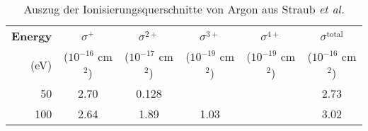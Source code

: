 \begin{table}[h]
    \centering
    \caption[Auszug der Ionisierungsquerschnitte von Argon aus Straub \textit{et al.} \cite{Straub}]{Auszug der Ionisierungsquerschnitte von Argon aus Straub \textit{et al.} \cite{Straub}}
    \begin{tabular}{r c c c c c}
        \toprule
        \textbf{Energy} & $\sigma^+$ & $\sigma^{2+}$ & $\sigma^{3+}$ & $\sigma^{4+}$ & $\sigma^{\text{total}}$ \\
        (eV) & ($10^{-16}$ cm$^2$) & ($10^{-17}$ cm$^2$) & ($10^{-19}$ cm$^2$) & ($10^{-19}$ cm$^2$) & ($10^{-16}$ cm$^2$) \\
        \midrule
        50  & 2.70   & 0.128  &        &        & 2.73   \\
        100 & 2.64   & 1.89   & 1.03   &        & 3.02   \\

\end{tabular}
\end{table}
